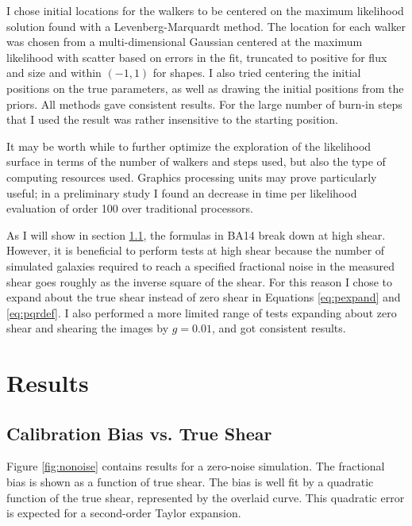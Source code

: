 \documentclass[usegraphicx,usenatbib]{mn2e}
\begin{document}
I chose initial locations for the walkers to be centered on the maximum
likelihood solution found with a Levenberg-Marquardt method\citep{Lev44}. The
location for each walker was chosen from a multi-dimensional Gaussian centered
at the maximum likelihood with scatter based on errors in the fit, truncated to
positive for flux and size and within $(-1,1)$ for shapes.  I also tried
centering the initial positions on the true parameters, as well as drawing the
initial positions from the priors.  All methods gave consistent results.  For
the large number of burn-in steps that I used the result was rather insensitive
to the starting position.

It may be worth while to further optimize the exploration of the likelihood
surface in terms of the number of walkers and steps used, but also the type of
computing resources used.  Graphics processing units may prove particularly
useful; in a preliminary study I found an decrease in time per likelihood
evaluation of order 100 over traditional processors.


As I will show in section \ref{sec:truebias}, the formulas in BA14 break down
at high shear.  However, it is beneficial to perform tests at high shear
because the number of simulated galaxies required to reach a specified
fractional noise in the measured shear goes roughly as the inverse square of
the shear.  For this reason I chose to expand about the true shear instead of
zero shear in Equations \ref{eq:pexpand} and \ref{eq:pqrdef}.  I also performed
a more limited range of tests expanding about zero shear and shearing the
images by $g=0.01$, and got consistent results. 

\section{Results} \label{sec:results}

\subsection{Calibration Bias vs. True Shear} \label{sec:truebias}

Figure \ref{fig:nonoise} contains results for a zero-noise simulation.  The
fractional bias is shown as a function of true shear.  The bias is well fit by
a quadratic function of the true shear, represented by the overlaid curve. This
quadratic error is expected for a second-order Taylor expansion.
\end{document}
